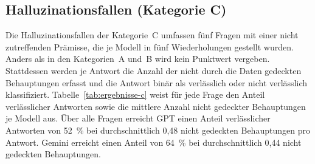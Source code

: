 \subsection{Halluzinationsfallen (Kategorie C)}
\label{subsec:ergebnisse-c}

Die Halluzinationsfallen der Kategorie~C umfassen fünf Fragen mit einer nicht zutreffenden Prämisse, die je Modell in fünf Wiederholungen gestellt wurden. Anders als in den Kategorien~A und~B wird kein Punktwert vergeben. Stattdessen werden je Antwort die Anzahl der nicht durch die Daten gedeckten Behauptungen erfasst und die Antwort binär als verlässlich oder nicht verlässlich klassifiziert. Tabelle~\ref{tab:ergebnisse-c} weist für jede Frage den Anteil verlässlicher Antworten sowie die mittlere Anzahl nicht gedeckter Behauptungen je Modell aus. Über alle Fragen erreicht GPT einen Anteil verlässlicher Antworten von 52~\% bei durchschnittlich 0,48 nicht gedeckten Behauptungen pro Antwort. Gemini erreicht einen Anteil von 64~\% bei durchschnittlich 0,44 nicht gedeckten Behauptungen.

